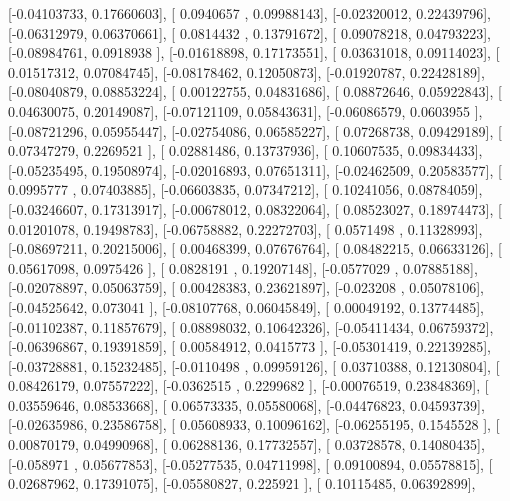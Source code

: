 \documentclass{article}
\begin{document}
       [-0.04103733,  0.17660603],
       [ 0.0940657 ,  0.09988143],
       [-0.02320012,  0.22439796],
       [-0.06312979,  0.06370661],
       [ 0.0814432 ,  0.13791672],
       [ 0.09078218,  0.04793223],
       [-0.08984761,  0.0918938 ],
       [-0.01618898,  0.17173551],
       [ 0.03631018,  0.09114023],
       [ 0.01517312,  0.07084745],
       [-0.08178462,  0.12050873],
       [-0.01920787,  0.22428189],
       [-0.08040879,  0.08853224],
       [ 0.00122755,  0.04831686],
       [ 0.08872646,  0.05922843],
       [ 0.04630075,  0.20149087],
       [-0.07121109,  0.05843631],
       [-0.06086579,  0.0603955 ],
       [-0.08721296,  0.05955447],
       [-0.02754086,  0.06585227],
       [ 0.07268738,  0.09429189],
       [ 0.07347279,  0.2269521 ],
       [ 0.02881486,  0.13737936],
       [ 0.10607535,  0.09834433],
       [-0.05235495,  0.19508974],
       [-0.02016893,  0.07651311],
       [-0.02462509,  0.20583577],
       [ 0.0995777 ,  0.07403885],
       [-0.06603835,  0.07347212],
       [ 0.10241056,  0.08784059],
       [-0.03246607,  0.17313917],
       [-0.00678012,  0.08322064],
       [ 0.08523027,  0.18974473],
       [ 0.01201078,  0.19498783],
       [-0.06758882,  0.22272703],
       [ 0.0571498 ,  0.11328993],
       [-0.08697211,  0.20215006],
       [ 0.00468399,  0.07676764],
       [ 0.08482215,  0.06633126],
       [ 0.05617098,  0.0975426 ],
       [ 0.0828191 ,  0.19207148],
       [-0.0577029 ,  0.07885188],
       [-0.02078897,  0.05063759],
       [ 0.00428383,  0.23621897],
       [-0.023208  ,  0.05078106],
       [-0.04525642,  0.073041  ],
       [-0.08107768,  0.06045849],
       [ 0.00049192,  0.13774485],
       [-0.01102387,  0.11857679],
       [ 0.08898032,  0.10642326],
       [-0.05411434,  0.06759372],
       [-0.06396867,  0.19391859],
       [ 0.00584912,  0.0415773 ],
       [-0.05301419,  0.22139285],
       [-0.03728881,  0.15232485],
       [-0.0110498 ,  0.09959126],
       [ 0.03710388,  0.12130804],
       [ 0.08426179,  0.07557222],
       [-0.0362515 ,  0.2299682 ],
       [-0.00076519,  0.23848369],
       [ 0.03559646,  0.08533668],
       [ 0.06573335,  0.05580068],
       [-0.04476823,  0.04593739],
       [-0.02635986,  0.23586758],
       [ 0.05608933,  0.10096162],
       [-0.06255195,  0.1545528 ],
       [ 0.00870179,  0.04990968],
       [ 0.06288136,  0.17732557],
       [ 0.03728578,  0.14080435],
       [-0.058971  ,  0.05677853],
       [-0.05277535,  0.04711998],
       [ 0.09100894,  0.05578815],
       [ 0.02687962,  0.17391075],
       [-0.05580827,  0.225921  ],
       [ 0.10115485,  0.06392899],
\end{document}
